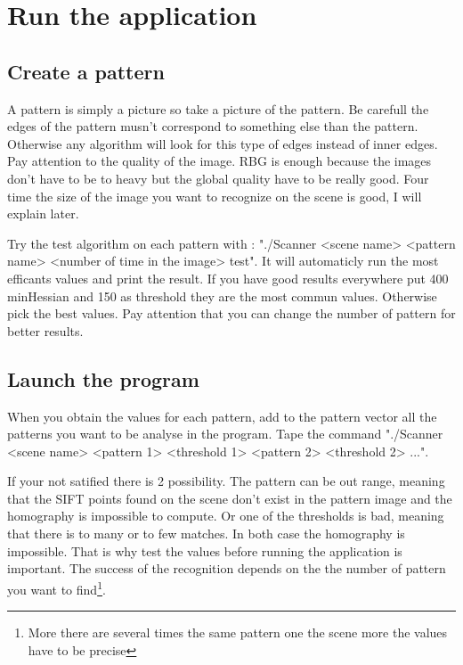 \documentclass[english,a4paper,11pt]{report}
\begin{document}
	\chapter{Run the application}
	
	\section{Create a pattern}
	\par A pattern is simply a picture so take a picture of the pattern. Be carefull the edges of the pattern musn't correspond to something else than the pattern. Otherwise any algorithm will look for this type of edges instead of inner edges.
	Pay attention to the quality of the image. RBG is enough because the images don't have to be to heavy but the global quality have to be really good. Four time the size of the image you want to recognize on the scene is good, I will explain later. 
	

	\par Try the test algorithm on each pattern with : "./Scanner <scene name> <pattern name> <number of time in the image> test". It will automaticly run the most efficants values and print the result. If you have good results everywhere put 400 minHessian and 150 as threshold they are the most commun values.
	Otherwise pick the best values. Pay attention that you can change the number of pattern for better results. %

	\section{Launch the program}

	\par When you obtain the values for each pattern, add to the pattern vector all the patterns you want to be analyse in the program. Tape the command "./Scanner <scene name> <pattern 1> <threshold 1> <pattern 2> <threshold 2> ...".
	
	\par If your not satified there is 2 possibility. The pattern can be out range, meaning that the SIFT points found on the scene don't exist in the pattern image and the homography is impossible to compute. Or one of the thresholds is bad, meaning that there is to many or to few matches. In both case the homography is impossible. That is why test the values before running the application is important. The success of the recognition depends on the the number of pattern you want to find\footnote{More there are several times the same pattern one the scene more the values have to be precise}.
	


	\listoffigures

	{}
	
	
\end{document}
